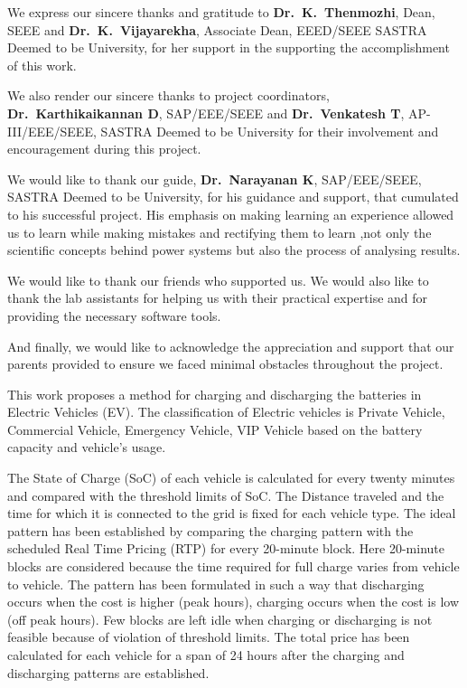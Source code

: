 \documentclass[a4paper, 12pt, oneside]{sastra}
\begin{document}
	\par We express our sincere thanks and gratitude to \textbf{Dr.~K.~Thenmozhi}, Dean, SEEE and \textbf{Dr.~K.~Vijayarekha}, Associate Dean, EEED/SEEE SASTRA Deemed to be University, for her support in the supporting the accomplishment of this work.
	
	\par We also render our sincere thanks to project coordinators, \textbf{Dr.~Karthikaikannan D}, SAP/EEE/SEEE and \textbf{Dr.~Venkatesh T}, AP-III/EEE/SEEE, SASTRA Deemed to be University for their involvement and encouragement during this project.
	
	\par We would like to thank our guide, \textbf{Dr.~Narayanan K}, SAP/EEE/SEEE, SASTRA Deemed to be University, for his guidance and support, that cumulated to his successful project. His emphasis on making learning an experience allowed us to learn while making mistakes and rectifying them to learn ,not only the scientific concepts behind power systems but also the process of analysing results.
	
	\par We would like to thank our friends who supported us. We would also like to thank the lab assistants for helping us with their practical expertise and for providing the necessary software tools.
	
	\par And finally, we would like to acknowledge the appreciation and support that our parents provided to ensure we faced minimal obstacles throughout the project.
	\pagebreak
	
	\abstract
	
	
	\vspace*{24pt}
	
	\noindent This work proposes a method for charging and discharging the batteries in Electric Vehicles (EV). The classification of Electric vehicles is Private Vehicle, Commercial Vehicle, Emergency Vehicle, VIP Vehicle based on the battery capacity and vehicle's usage.
	
	\noindent The State of Charge (SoC) of each vehicle is calculated for every twenty minutes and compared with the threshold limits of SoC. The Distance traveled and the time for which it is connected to the grid is fixed for each vehicle type. The ideal pattern has been established by comparing the charging pattern with the scheduled Real Time Pricing (RTP) for every 20-minute block. Here 20-minute blocks are considered because the time required for full charge varies from vehicle to vehicle. The pattern has been formulated in such a way that discharging occurs when the cost is higher (peak hours), charging occurs when the cost is low (off peak hours). Few blocks are left idle when charging or discharging is not feasible because of violation of threshold limits. The total price has been calculated for each vehicle for a span of 24 hours after the charging and discharging patterns are established.
	
\end{document}
